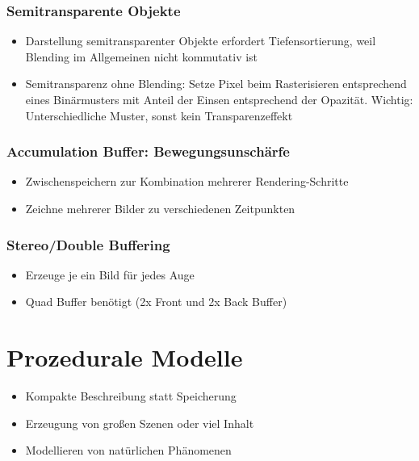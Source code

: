 \subsubsection{Semitransparente Objekte}
\begin{itemize}
	\item Darstellung semitransparenter Objekte erfordert Tiefensortierung, weil Blending im Allgemeinen nicht kommutativ ist
	\item Semitransparenz ohne Blending: Setze Pixel beim Rasterisieren entsprechend eines Binärmusters mit Anteil der Einsen entsprechend der Opazität. Wichtig: Unterschiedliche Muster, sonst kein Transparenzeffekt
\end{itemize}

\subsubsection{Accumulation Buffer: Bewegungsunschärfe}
\begin{itemize}
	\item Zwischenspeichern zur Kombination mehrerer Rendering-Schritte
	\item Zeichne mehrerer Bilder zu verschiedenen Zeitpunkten
\end{itemize}

\subsubsection{Stereo/Double Buffering}
\begin{itemize}
	\item Erzeuge je ein Bild für jedes Auge
	\item Quad Buffer benötigt (2x Front und 2x Back Buffer)
\end{itemize}



\section{Prozedurale Modelle}
\begin{itemize}
	\item Kompakte Beschreibung statt Speicherung
	\item Erzeugung von großen Szenen oder viel Inhalt
	\item Modellieren von natürlichen Phänomenen
\end{itemize}


